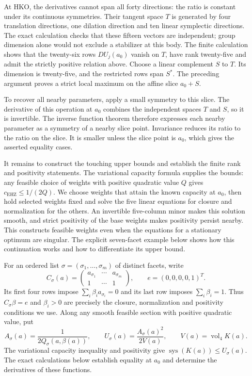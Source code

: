 At HKO, the derivatives cannot span all forty directions: the ratio is
constant under its continuous symmetries. Their tangent space $T$ is generated by four translation directions, one
dilation direction and ten linear symplectic directions. The exact calculation
checks that these fifteen vectors are independent; group dimension alone
would not exclude a stabilizer at this body. The finite calculation
shows that the twenty-six rows $DU_j(a_0)$ vanish on $T$, have rank
twenty-five and admit the strictly positive relation above. Choose a linear
complement $S$ to $T$. Its dimension is twenty-five, and the restricted rows
span $S^*$. The preceding argument proves a strict local maximum on the
affine slice $a_0+S$.

To recover all nearby parameters, apply a small symmetry to this slice.
The derivative of this operation at $a_0$ combines the independent spaces
$T$ and $S$, so it is invertible. The inverse function theorem therefore
expresses each nearby parameter as a symmetry of a nearby slice point.
Invariance reduces its ratio to the ratio on the slice. It is smaller unless
the slice point is $a_0$, which gives the asserted equality cases.

It remains to construct the touching upper bounds and establish the finite
rank and positivity statements. The variational capacity formula supplies
the bounds: any feasible choice of weights with positive quadratic value
$Q$ gives $c_{\mathrm{EHZ}}\leq1/(2Q)$. We choose weights that attain the
known capacity at $a_0$, then hold selected weights fixed and solve the five linear equations for
closure and normalization for the others. An invertible five-column minor
makes this solution smooth, and strict positivity of the base weights makes
positivity persist nearby. This constructs feasible weights even when the
equations for a stationary optimum are singular. The explicit seven-facet example below
shows how this continuation works and how to differentiate its upper bound.

For an ordered list $\sigma=(\sigma_1,\ldots,\sigma_m)$ of distinct facets,
write
\[
 C_\sigma(a)=
 \begin{pmatrix}a_{\sigma_1}&\cdots&a_{\sigma_m}\\1&\cdots&1\end{pmatrix},
 \qquad e=(0,0,0,0,1)^T.
\]
Its first four rows impose $\sum_i\beta_i a_{\sigma_i}=0$ and its last
row imposes $\sum_i\beta_i=1$. Thus $C_\sigma\beta=e$ and $\beta_i>0$
are precisely the closure, normalization and positivity conditions we use.
Along any smooth feasible section with positive quadratic value, put
\[
 A_\sigma(a)=\frac{1}{2Q_\sigma(a,\beta(a))},\qquad
 U_\sigma(a)=\frac{A_\sigma(a)^2}{2V(a)},\qquad
 V(a)=\operatorname{vol}_4 K(a).
\]
The variational capacity inequality and positivity give
$\operatorname{sys}(K(a))\leq U_\sigma(a)$. The exact calculations below
establish equality at $a_0$ and determine the derivatives of these functions.
